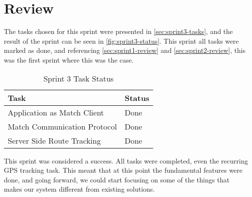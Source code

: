 \section{Review}
\label{sec:sprint3-review}

The tasks chosen for this sprint were presented in \autoref{sec:sprint3-tasks}, and the result of the sprint can be seen in \autoref{fig:sprint3-status}. This sprint all tasks were marked as done, and referencing \autoref{sec:sprint1-review} and \autoref{sec:sprint2-review}, this was the first sprint where this was the case.

\begin{table}[!ht]
	\centering
	\caption{Sprint 3 Task Status}
	\label{fig:sprint3-status}
	\begin{tabular}{|l|l|}
		\hline
		\textbf{Task} & \textbf{Status} \\
		\hline
		Application as Match Client & Done \\
		\hline
		Match Communication Protocol & Done \\
		\hline
		Server Side Route Tracking & Done \\
		\hline
	\end{tabular}
\end{table}

This sprint was considered a success. All tasks were completed, even the recurring \ac{GPS} tracking task. This meant that at this point the fundamental features were done, and going forward, we could start focusing on some of the things that makes our system different from existing solutions.
